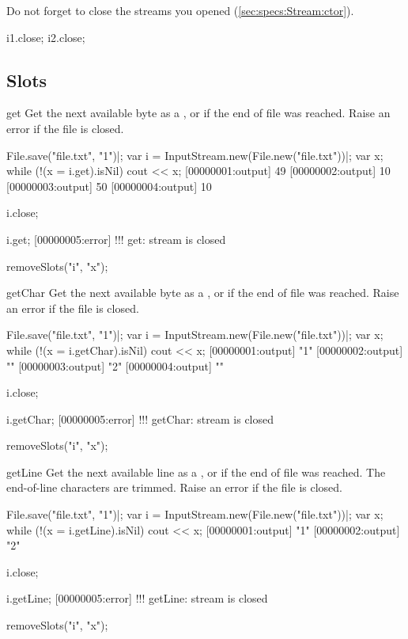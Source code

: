 Do not forget to close the streams you opened
(\autoref{sec:specs:Stream:ctor}).

\begin{urbiscript}
i1.close;
i2.close;
\end{urbiscript}



\subsection{Slots}

\begin{urbiscriptapi}
\item[get]%
  Get the next available byte as a , or  if
  the end of file was reached.  Raise an error if the file is closed.
\begin{urbiscript}
File.save("file.txt", "1\n")|;
var i = InputStream.new(File.new("file.txt"))|;
var x;
while (!(x = i.get).isNil)
  cout << x;
[00000001:output] 49
[00000002:output] 10
[00000003:output] 50
[00000004:output] 10

i.close;

i.get;
[00000005:error] !!! get: stream is closed
\end{urbiscript}
\begin{urbicomment}
removeSlots("i", "x");
\end{urbicomment}


\item[getChar]%
  Get the next available byte as a , or 
  if the end of file was reached.  Raise an error if the file is closed.
\begin{urbiscript}
File.save("file.txt", "1\n")|;
var i = InputStream.new(File.new("file.txt"))|;
var x;
while (!(x = i.getChar).isNil)
  cout << x;
[00000001:output] "1"
[00000002:output] "\n"
[00000003:output] "2"
[00000004:output] "\n"

i.close;

i.getChar;
[00000005:error] !!! getChar: stream is closed
\end{urbiscript}
\begin{urbicomment}
removeSlots("i", "x");
\end{urbicomment}


\item[getLine]%
  Get the next available line as a , or  if
  the end of file was reached.  The end-of-line characters are trimmed.
  Raise an error if the file is closed.
\begin{urbiscript}
File.save("file.txt", "1\n")|;
var i = InputStream.new(File.new("file.txt"))|;
var x;
while (!(x = i.getLine).isNil)
  cout << x;
[00000001:output] "1"
[00000002:output] "2"

i.close;

i.getLine;
[00000005:error] !!! getLine: stream is closed
\end{urbiscript}
\begin{urbicomment}
removeSlots("i", "x");
\end{urbicomment}
\end{urbiscriptapi}



